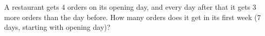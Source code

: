 A restaurant gets $4$ orders on its opening day, and every day after that it gets $3$ more orders than the day before. How many orders does it get in its first week ($7$ days, starting with opening day)?

